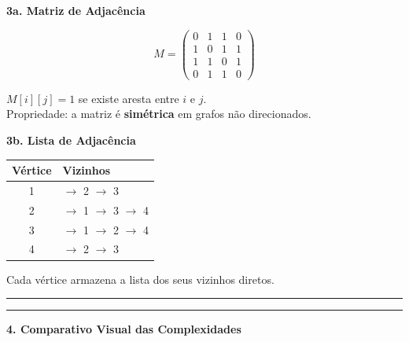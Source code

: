 \documentclass[12pt,a4paper]{article}
\begin{document}
\begin{minipage}[t]{0.48\textwidth}
\textbf{3a. Matriz de Adjacência}

$$M = \begin{pmatrix}
 0 & 1 & 1 & 0 \\
 1 & 0 & 1 & 1 \\
 1 & 1 & 0 & 1 \\
 0 & 1 & 1 & 0
\end{pmatrix}$$

$M[i][j] = 1$ se existe aresta entre $i$ e $j$.\\
Propriedade: a matriz é \textbf{simétrica} em grafos não direcionados.
\end{minipage}
\hfill
\begin{minipage}[t]{0.48\textwidth}
\textbf{3b. Lista de Adjacência}

\renewcommand{\arraystretch}{1.4}
\begin{tabular}{c|l}
    \textbf{Vértice} & \textbf{Vizinhos} \\ \hline
    1 & $\to$ 2 $\to$ 3 \\
    2 & $\to$ 1 $\to$ 3 $\to$ 4 \\
    3 & $\to$ 1 $\to$ 2 $\to$ 4 \\
    4 & $\to$ 2 $\to$ 3 \\
\end{tabular}

\vspace{0.2cm}
Cada vértice armazena a lista dos seus vizinhos diretos.
\end{minipage}

\vspace{0.5cm}
\hrule
\vspace{0.4cm}



\vspace{0.5cm}
\hrule
\vspace{0.4cm}

\noindent\textbf{4. Comparativo Visual das Complexidades}
\end{document}

